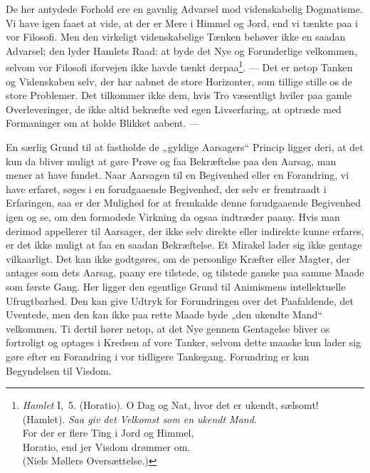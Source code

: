 \documentclass[12pt,a4paper]{article}
\newcommand{\opage}[1]{\marginnote{\footnotesize\textit{[#1]}}}
\begin{document}
De her antydede Forhold ere en gavnlig Advarsel mod videnskabelig
Dogmatisme. Vi have igen faaet at vide, at der er Mere i Himmel og Jord, end
vi tænkte paa i vor Filosofi. Men den virkeligt videnskabelige Tænken behøver
ikke en saadan Advarsel; den lyder Hamlets Raad: at byde det Nye og
Forunderlige velkommen, selvom vor Filosofi iforvejen ikke havde tænkt
derpaa\footnote{\emph{Hamlet} I,~5. (Horatio). O Dag og Nat, hvor det er
ukendt, sælsomt!\\ (Hamlet). \emph{Saa giv det Velkomst som en ukendt
Mand.}\\ For der er flere Ting i Jord og Himmel,\\ Horatio, end jer Visdom
drømmer om.\\ (Niels Møllers Oversættelse.)}. --- Det er netop Tanken og
Videnskaben selv, der har aabnet de store Horizonter, som tillige stille os
de store Problemer. Det tilkommer ikke dem, hvis Tro væsentligt hviler paa
gamle Overleveringer, de ikke altid bekræfte ved egen Livserfaring, at
optræde med Formaninger om at holde Blikket aabent. ---

En særlig Grund til at fastholde de „gyldige Aarsagers“ Princip ligger deri,
at det kun da bliver muligt at gøre Prøve og faa Bekræftelse paa den Aarsag,
man mener at have fundet. Naar Aarsagen til en Begivenhed eller en
Forandring, vi have erfaret, søges i en forudgaaende Begivenhed, der selv er
fremtraadt i Erfaringen, saa er der Mulighed for at fremkalde denne
forudgaaende Begivenhed igen og se, om den formodede Virkning da ogsaa
indtræder paany. Hvis man derimod appellerer til \opage{27} Aarsager, der ikke selv
direkte eller indirekte kunne erfares, er det ikke muligt at faa en saadan
Bekræftelse. Et Mirakel lader sig ikke gentage vilkaarligt. Det kan ikke
godtgøres, om de personlige Kræfter eller Magter, der antages som dets
Aarsag, paany ere tilstede, og tilstede ganske paa samme Maade som første
Gang. Her ligger den egentlige Grund til Animismens intellektuelle
Ufrugtbarhed. Den kan give Udtryk for Forundringen over det Paafaldende, det
Uventede, men den kan ikke paa rette Maade byde „den ukendte Mand“
velkommen. Ti dertil hører netop, at det Nye gennem Gentagelse bliver os
fortroligt og optages i Kredsen af vore Tanker, selvom dette maaske kun
lader sig gøre efter en Forandring i vor tidligere Tankegang. Forundring er
kun Begyndelsen til Visdom.
\end{document}
